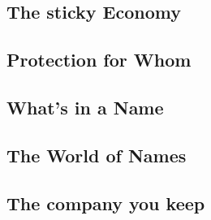 \documentclass[a4paper, twocolumn]{article}
\begin{document}
\subsection{The sticky Economy}

\subsection{Protection for Whom}

\subsection{What's in a Name}

\subsection{The World of Names}

\subsection{The company you keep}

\onecolumn{
{}

}
\end{document}
